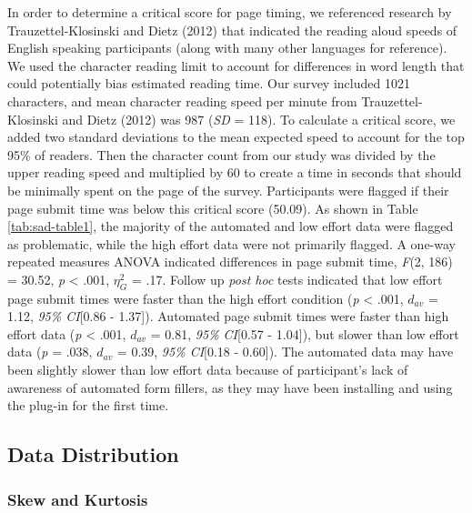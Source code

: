 \documentclass[english,man]{apa6}
\theoremstyle{definition}
\theoremstyle{definition}
\theoremstyle{definition}
\theoremstyle{remark}
\begin{document}
In order to determine a critical score for page timing, we referenced
research by Trauzettel-Klosinski and Dietz (2012) that indicated the
reading aloud speeds of English speaking participants (along with many
other languages for reference). We used the character reading limit to
account for differences in word length that could potentially bias
estimated reading time. Our survey included 1021 characters, and mean
character reading speed per minute from Trauzettel-Klosinski and Dietz
(2012) was 987 (\emph{SD} = 118). To calculate a critical score, we
added two standard deviations to the mean expected speed to account for
the top 95\% of readers. Then the character count from our study was
divided by the upper reading speed and multiplied by 60 to create a time
in seconds that should be minimally spent on the page of the survey.
Participants were flagged if their page submit time was below this
critical score (50.09). As shown in Table \ref{tab:sad-table1}, the
majority of the automated and low effort data were flagged as
problematic, while the high effort data were not primarily flagged. A
one-way repeated measures ANOVA indicated differences in page submit
time, \emph{F}(2, 186) = 30.52, \emph{p} \textless{} .001, \(\eta_G^2\)
= .17. Follow up \emph{post hoc} tests indicated that low effort page
submit times were faster than the high effort condition (\emph{p}
\textless{} .001, \(d_{av}\) = 1.12, \emph{95\% CI}{[}0.86 - 1.37{]}).
Automated page submit times were faster than high effort data (\emph{p}
\textless{} .001, \(d_{av}\) = 0.81, \emph{95\% CI}{[}0.57 - 1.04{]}),
but slower than low effort data (\emph{p} = .038, \(d_{av}\) = 0.39,
\emph{95\% CI}{[}0.18 - 0.60{]}). The automated data may have been
slightly slower than low effort data because of participant's lack of
awareness of automated form fillers, as they may have been installing
and using the plug-in for the first time.

\subsection{Data Distribution}\label{data-distribution-1}

\subsubsection{Skew and Kurtosis}\label{skew-and-kurtosis}
\end{document}
